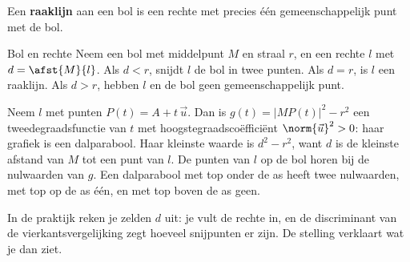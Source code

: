 \begin{theorie}
Een \textbf{\textcolor{accent}{raaklijn}} aan een bol is een rechte met precies één gemeenschappelijk punt met de bol.

\begin{stelling}{Bol en rechte}
Neem een bol met middelpunt $M$ en straal $r$, en een rechte $l$ met $d = \afst{M}{l}$. Als $d < r$, snijdt $l$ de bol in twee punten. Als $d = r$, is $l$ een raaklijn. Als $d > r$, hebben $l$ en de bol geen gemeenschappelijk punt.
\end{stelling}

\begin{bewijs}
Neem $l$ met punten $P(t) = A + t\,\vec u$. Dan is $g(t) = |MP(t)|^2 - r^2$ een tweedegraadsfunctie van $t$ met hoogstegraadscoëfficiënt $\norm{\vec u}^2 > 0$: haar grafiek is een dalparabool. Haar kleinste waarde is $d^2 - r^2$, want $d$ is de kleinste afstand van $M$ tot een punt van $l$. De punten van $l$ op de bol horen bij de nulwaarden van $g$. Een dalparabool met top onder de as heeft twee nulwaarden, met top op de as één, en met top boven de as geen.
\end{bewijs}
\end{theorie}

In de praktijk reken je zelden $d$ uit: je vult de rechte in, en de discriminant van de vierkantsvergelijking zegt hoeveel snijpunten er zijn. De stelling verklaart wat je dan ziet.


